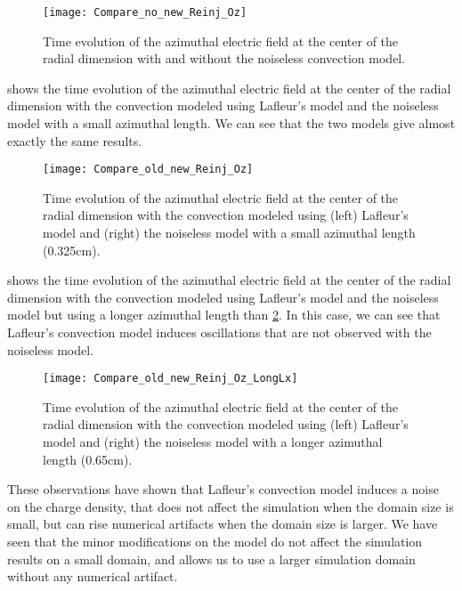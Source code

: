       
      \begin{figure}[hbt]
        \centering
        \texttt{[image: Compare\_no\_new\_Reinj\_Oz]}
        \caption{Time evolution of the azimuthal electric field at the center of the radial dimension with and without the noiseless convection model. }
        \label{fig-newconv_noconv}
      \end{figure}
      
      
       shows the time  evolution of the azimuthal electric field at the center of the radial dimension  with the convection modeled using Lafleur's model and the noiseless model with a small azimuthal length.
      We can see that the two models give almost exactly the same results.
      
      \begin{figure}[hbt]
        \centering
        \texttt{[image: Compare\_old\_new\_Reinj\_Oz]}
        \caption{Time evolution of the azimuthal electric field at the center of the radial dimension with the convection modeled using (left) Lafleur's model and (right) the noiseless model with a small azimuthal length (0.325cm).}
        \label{fig-oldeconv_newconv}
      \end{figure}
      
      
       shows the  time  evolution of the azimuthal electric field at the center of the radial dimension  with the convection modeled using Lafleur's model and the noiseless model but using a longer azimuthal length than \cref{fig-oldeconv_newconv}.
      In this case, we can see that Lafleur's convection model induces oscillations that are not observed with the noiseless model.
      
      \begin{figure}[hbt]
        \centering
        \texttt{[image: Compare\_old\_new\_Reinj\_Oz\_LongLx]}
        \caption{Time evolution of the azimuthal electric field at the center of the radial dimension with the convection modeled using (left) Lafleur's model and (right) the noiseless model with a longer azimuthal length (0.65cm).}
        \label{fig-oldeconv_newconv_longLZ}
      \end{figure}


      These observations have shown that Lafleur's convection model induces a noise on the charge density, that does not affect the simulation when the domain size is small, but can rise numerical artifacts when the domain size is larger.
      We have seen that the minor modifications on the model do not affect the simulation results on a small domain, and allows us to use a larger simulation domain without any numerical artifact.
      
